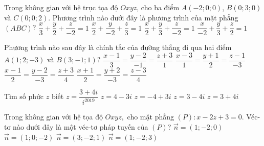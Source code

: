 \begin{ex}%
	Trong không gian với hệ trục tọa độ $Oxyz$, cho ba điểm $A(-2;0;0)$, $B(0;3;0)$ và $C(0;0;2)$. Phương trình nào dưới đây là phương trình của mặt phẳng $(ABC)$?
	\choice
	{$\dfrac{x}{3}+\dfrac{y}{2}+\dfrac{z}{-2}=1$}
	{$\dfrac{x}{2}+\dfrac{y}{-2}+\dfrac{z}{3}=1$}
	{$\dfrac{x}{2}+\dfrac{y}{3}+\dfrac{z}{-2}=1$}
	{\True $\dfrac{x}{-2}+\dfrac{y}{3}+\dfrac{z}{2}=1$}
\end{ex}
\begin{ex}%
	Phương trình nào sau đây là chính tắc của đường thẳng đi qua hai điểm $A\left(1;2;-3\right)$ và $B\left(3;-1;1\right)$?
	\choice
	{$\dfrac{x-1}{3}=\dfrac{y-2}{-1}=\dfrac{z+3}{1}$}
	{$\dfrac{x-3}{1}=\dfrac{y+1}{2}=\dfrac{z-1}{-3}$}
	{\True $\dfrac{x-1}{2}=\dfrac{y-2}{-3}=\dfrac{z+3}{4}$}
	{$\dfrac{x+1}{2}=\dfrac{y+2}{-3}=\dfrac{z-3}{4}$}
\end{ex}
\begin{ex}%
	Tìm số phức $z$ biết $z=\dfrac{3+4i}{i^{2019}}$
	\choice
	{$z=4-3i$}
	{\True $z=-4+3i$}
	{$z=3-4i$}
	{$z=3+4i$}
\end{ex}
\begin{ex}%
	Trong không gian với hệ tọa độ $Oxyz,$ cho mặt phẳng $(P)\colon x-2z+3=0.$ Véc-tơ nào dưới đây là một véc-tơ pháp tuyến của $(P)$?
	\choice
	{$\overrightarrow{n}=\left(1;-2;0\right)$}
	{\True $\overrightarrow{n}=\left(1;0;-2\right)$}
	{$\overrightarrow{n}=\left(3;-2;1\right)$}
	{$\overrightarrow{n}=\left(1;-2;3\right)$}
	\loigiai{}
\end{ex}


